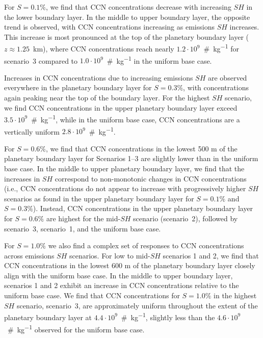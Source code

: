 For $S=0.1\%$, we find that CCN concentrations decrease with increasing $SH$ in the lower boundary layer. In the middle to upper boundary layer, the opposite trend is observed, with CCN concentrations increasing as emissions $SH$ increases. This increase is most pronounced at the top of the planetary boundary layer ($z\approx 1.25$~km), where CCN concentrations reach nearly $1.2\cdot10^{9}$~\#~\si{kg^{-1}} for scenario~3 compared to $1.0\cdot10^{9}$~\#~\si{kg^{-1}} in the uniform base case. 

Increases in CCN concentrations due to increasing emissions $SH$ are observed everywhere in the planetary boundary layer for $S=0.3\%$, with concentrations again peaking near the top of the boundary layer. For the highest $SH$ scenario, we find CCN concentrations in the upper planetary boundary layer exceed $3.5\cdot10^{9}$~\#~\si{kg^{-1}}, while in the uniform base case, CCN concentrations are a vertically uniform $2.8\cdot10^{9}$~\#~\si{kg^{-1}}. 

For $S=0.6\%$, we find that CCN concentrations in the lowest 500 m of the planetary boundary layer for Scenarios 1--3 are slightly lower than in the uniform base case. In the middle to upper planetary boundary layer, we find that the increases in $SH$ correspond to non-monotonic changes in CCN concentrations (i.e., CCN concentrations do not appear to increase with progressively higher $SH$ scenarios as found in the upper planetary boundary layer for $S=0.1\%$ and $S=0.3\%$). Instead, CCN concentrations in the upper planetary boundary layer for $S=0.6\%$ are highest for the mid-$SH$ scenario (scenario~2), followed by scenario~3, scenario~1, and the uniform base case. 

For $S=1.0\%$ we also find a complex set of responses to CCN concentrations across emissions $SH$ scenarios. For low to mid-$SH$ scenarios 1 and 2, we find that CCN concentrations in the lowest $600$ m of the planetary boundary layer closely align with the uniform base case. In the middle to upper boundary layer, scenarios 1 and 2 exhibit an increase in CCN concentrations relative to the uniform base case. We find that CCN concentrations for $S=1.0\%$ in the highest $SH$ scenario, scenario~3, are approximately uniform throughout the extent of the planetary boundary layer at $4.4\cdot10^{9}$~\#~\si{kg^{-1}}, slightly less than the $4.6\cdot10^{9}$~\#~\si{kg^{-1}} observed for the uniform base case. 

